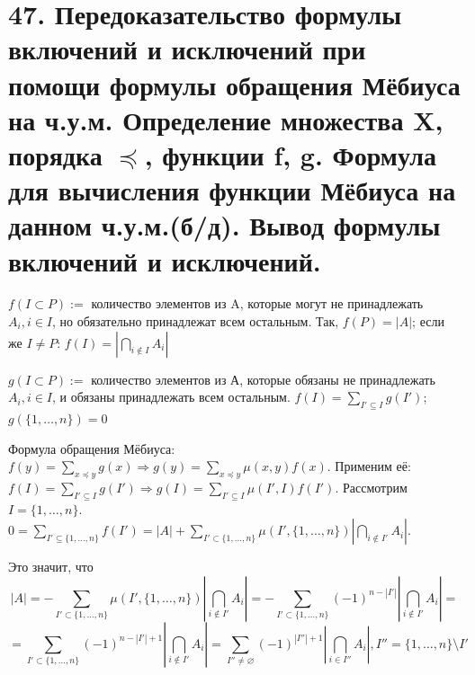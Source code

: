 \section*{47. Передоказательство формулы включений и исключений при помощи формулы обращения Мёбиуса на ч.у.м. Определение множества X, порядка $\preceq$, функции f, g. Формула для вычисления функции Мёбиуса на данном ч.у.м.(б/д). Вывод формулы включений и исключений.}

$f(I \subset P) :=$ количество элементов из A, которые могут не принадлежать $A_i, i \in I$, но обязательно принадлежат всем остальным. Так, $f(P) = |A|$; если же $I \neq P$: $f(I) = |\bigcap_{i \notin I} A_i|$ \par
$g(I \subset P) :=$ количество элементов из А, которые обязаны не принадлежать $A_i, i \in I$, и обязаны принадлежать всем остальным. $f(I) = \sum_{I' \subseteq I} g(I')$; $g(\{1, \dots, n\}) = 0$\par 
Формула обращения Мёбиуса: $f(y) = \sum_{x\preceq y}g(x) \Rightarrow g(y) = \sum_{x \preceq y} \mu(x, y)f(x)$. Применим её:
$ f(I) = \sum_{I' \subseteq I}g(I') \Rightarrow g(I) = \sum_{I' \subseteq I} \mu(I', I)f(I')$.
Рассмотрим $I = \{1, \dots, n\}$. $0 = \sum_{I' \subseteq \{1, \dots, n\}}f(I') = |A| + \sum_{I' \subset \{1, \dots, n\}}\mu(I', \{1, \dots, n\})|\bigcap_{i \notin I'} A_i|$. \par
Это значит, что 
\[ |A| = - \sum_{I' \subset \{1, \dots, n\}}\mu(I', \{1, \dots, n\})|\bigcap_{i \notin I'} A_i| = - \sum_{I' \subset \{1, \dots, n\}} (-1)^{n-|I'|} |\bigcap_{i \notin I'} A_i| =\] \[= \sum_{I' \subset \{1, \dots, n\}} (-1)^{n-|I'| + 1} |\bigcap_{i \notin I'} A_i| = \sum_{I'' \neq \varnothing} (-1)^{|I''|+1} |\bigcap_{i \in I''} A_i|, I'' = \{1, \dots, n\} \setminus I'\]
